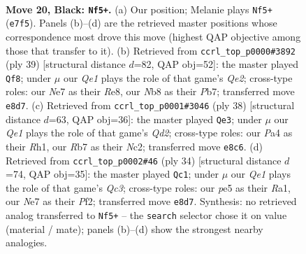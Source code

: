 \documentclass[11pt]{article}
\begin{document}
\clearpage

\begin{figure}[p]\centering
\begin{subfigure}{0.46\textwidth}\centering
\resizebox{\linewidth}{!}{%
\newchessgame
\chessboard[
  setfen={1nb1qrk1/1r2nppp/3Np3/2ppP3/p4P2/6K1/PPP3PP/R2Q1BNR b - - 1 20},
  showmover=false,
  pgfstyle=straightmove, color=movearrow, markmove={e7-f5}
]}
\caption{}
\end{subfigure}\hfill
\begin{subfigure}{0.46\textwidth}\centering
\resizebox{\linewidth}{!}{%
\newchessgame
\chessboard[
  setfen={r3r1k1/ppp1qpbp/3pn1p1/3N4/2P1P2P/5PP1/PPQ2BK1/R2R4 b - - 2 20},
  showmover=false,
  pgfstyle=straightmove, color=movearrow, markmove={e7-f8}
]}
\caption{}
\end{subfigure}
\\[4pt]
\begin{subfigure}{0.46\textwidth}\centering
\resizebox{\linewidth}{!}{%
\newchessgame
\chessboard[
  setfen={r3k2r/1b1pqpp1/1p5p/4p3/p1P1Pn2/PnNB4/1PNQ1PPP/1K1R3R w kq - 4 20},
  showmover=false,
  pgfstyle=straightmove, color=movearrow, markmove={d2-e3}
]}
\caption{}
\end{subfigure}\hfill
\begin{subfigure}{0.46\textwidth}\centering
\resizebox{\linewidth}{!}{%
\newchessgame
\chessboard[
  setfen={r2qr1k1/1p1n1ppp/p1p1p3/P2n4/3Pb3/1PQ2NP1/1B2PPBP/R2R2K1 w - - 3 18},
  showmover=false,
  pgfstyle=straightmove, color=movearrow, markmove={c3-c1}
]}
\caption{}
\end{subfigure}
\caption{\textbf{Move 20, Black: \texttt{Nf5+}.} (a) Our position; Melanie plays \texttt{Nf5+} (\texttt{e7f5}). Panels (b)--(d) are the retrieved master positions whose correspondence most drove this move (highest QAP objective among those that transfer to it). (b) Retrieved from \texttt{ccrl\_top\_p0000\#3892} (ply 39) [structural distance $d$=82, QAP obj=52]: the master played \texttt{Qf8}; under $\mu$ our \emph{Qe1} plays the role of that game's \emph{Qe2}; cross-type roles: our \emph{N}e7 as their \emph{R}e8, our \emph{N}b8 as their \emph{P}b7; transferred move \texttt{e8d7}. (c) Retrieved from \texttt{ccrl\_top\_p0001\#3046} (ply 38) [structural distance $d$=63, QAP obj=36]: the master played \texttt{Qe3}; under $\mu$ our \emph{Qe1} plays the role of that game's \emph{Qd2}; cross-type roles: our \emph{P}a4 as their \emph{R}h1, our \emph{R}b7 as their \emph{N}c2; transferred move \texttt{e8c6}. (d) Retrieved from \texttt{ccrl\_top\_p0002\#46} (ply 34) [structural distance $d$=74, QAP obj=35]: the master played \texttt{Qc1}; under $\mu$ our \emph{Qe1} plays the role of that game's \emph{Qc3}; cross-type roles: our \emph{p}e5 as their \emph{R}a1, our \emph{N}e7 as their \emph{P}f2; transferred move \texttt{e8d7}. Synthesis: no retrieved analog transferred to \texttt{Nf5+} -- the \texttt{search} selector chose it on value (material / mate); panels (b)--(d) show the strongest nearby analogies.}
\label{fig:thought-m39}
\end{figure}
\end{document}
